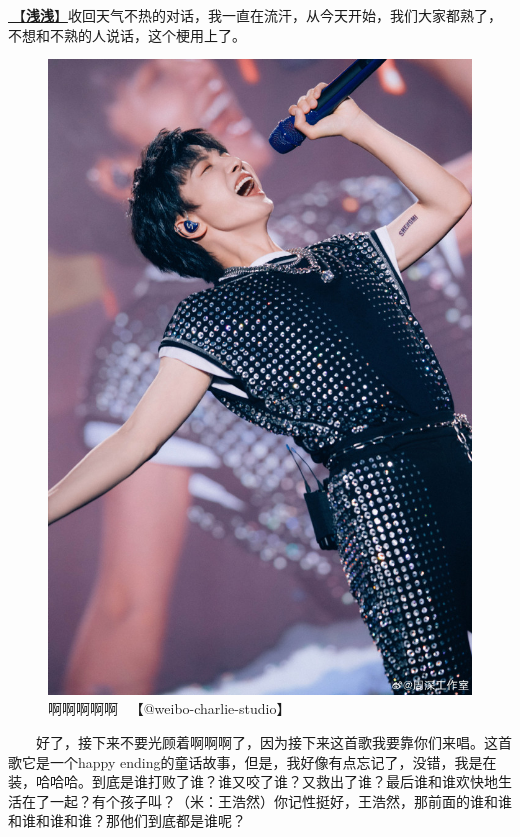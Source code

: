 \documentclass[]{ctexbook}
\begin{document}
\hyperref[qianqian]{🎵【\textbf{浅浅}】}收回天气不热的对话，我一直在流汗，从今天开始，我们大家都熟了，不想和不熟的人说话，这个梗用上了。

\begin{figure}

{\centering \includegraphics[width=400pt]{img/chengdu20240615/004} 

}

\caption{啊啊啊啊啊~ 【@weibo-charlie-studio】}\label{fig:unnamed-chunk-50}
\end{figure}

  好了，接下来不要光顾着啊啊啊了，因为接下来这首歌我要靠你们来唱。这首歌它是一个happy ending的童话故事，但是，我好像有点忘记了，没错，我是在装，哈哈哈。到底是谁打败了谁？谁又咬了谁？又救出了谁？最后谁和谁欢快地生活在了一起？有个孩子叫？（米：王浩然）你记性挺好，王浩然，那前面的谁和谁和谁和谁和谁？那他们到底都是谁呢？
\end{document}
